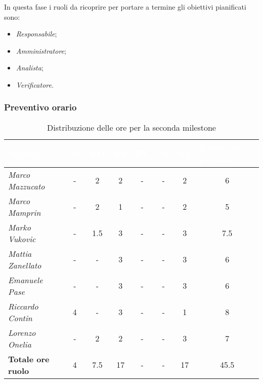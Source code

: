 In questa fase i ruoli da ricoprire per portare a termine gli obiettivi
pianificati sono:
\begin{itemize}
    \item \textit{Responsabile};
    \item \textit{Amministratore};
    \item \textit{Analista};
    \item \textit{Verificatore}.
\end{itemize}

\subsubsection{Preventivo orario}

\begin{table}[H]
    \renewcommand\arraystretch{1.5}
    \centering
    \begin{tabular}{|l|c|c|c|c|c|c|c|}
    \hline
    \rowcolor[HTML]{036400}
    \textcolor{white}{\textbf{Membro}} & \multicolumn{1}{l|}{\textcolor{white}{\textbf{RE}}} & \multicolumn{1}{l|}{\textcolor{white}{\textbf{AM}}} & \multicolumn{1}{l|}{\textcolor{white}{\textbf{AN}}} & \multicolumn{1}{l|}{\textcolor{white}{\textbf{PT}}} & \multicolumn{1}{l|}{\textcolor{white}{\textbf{PR}}} & \multicolumn{1}{l|}{\textcolor{white}{\textbf{VE}}} & \multicolumn{1}{l|}{\textcolor{white}{\textbf{Totale ore persona}}} \\ \hline
    \rowcolor[HTML]{EFEFEF}\textit{Marco Mazzucato}  & - & 2   & 2  & - & - & 2  & 6   \\ \hline
    \rowcolor[HTML]{C0C0C0}\textit{Marco Mamprin}    & - & 2   & 1  & - & - & 2  & 5   \\ \hline
    \rowcolor[HTML]{EFEFEF}\textit{Marko Vukovic}    & - & 1.5 & 3  & - & - & 3  & 7.5 \\ \hline
    \rowcolor[HTML]{C0C0C0}\textit{Mattia Zanellato} & - & -   & 3  & - & - & 3  & 6   \\ \hline
    \rowcolor[HTML]{EFEFEF}\textit{Emanuele Pase}    & - & -   & 3  & - & - & 3  & 6   \\ \hline
    \rowcolor[HTML]{C0C0C0}\textit{Riccardo Contin}  & 4 & -   & 3  & - & - & 1  & 8   \\ \hline
    \rowcolor[HTML]{EFEFEF}\textit{Lorenzo Onelia}   & - & 2   & 2  & - & - & 3  & 7   \\ \hline
    \rowcolor[HTML]{C0C0C0}\textbf{Totale ore ruolo} & 4 & 7.5 & 17 & - & - & 17 & 45.5\\ \hline
    \end{tabular}
    \caption{Distribuzione delle ore per la seconda milestone}
\end{table}

